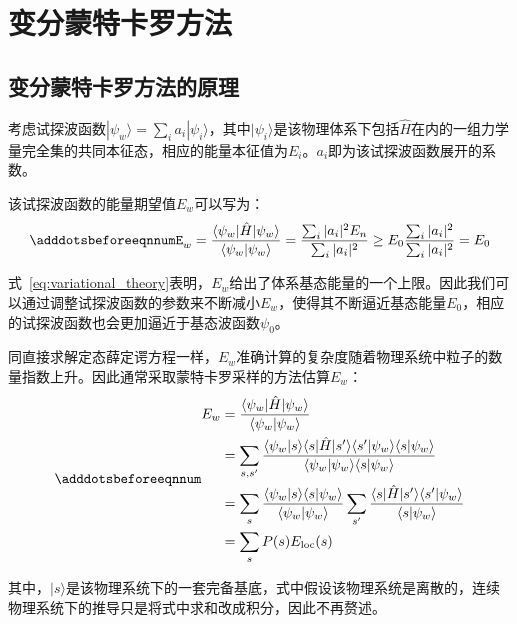 \chapter{变分蒙特卡罗方法}\label{chap:variational_Monte_Carlo}
\section{变分蒙特卡罗方法的原理}
考虑试探波函数$|\psi_w \rangle = \sum_i a_i |\psi_{i}\rangle$，其中$|\psi_{i}\rangle$是该物理体系下包括$\hat{H}$在内的一组力学量完全集的共同本征态，相应的能量本征值为$E_i$。$a_i$即为该试探波函数展开的系数。

该试探波函数的能量期望值$E_w$可以写为：
\begin{equation} \label{eq:variational_theory}
    \adddotsbeforeeqnnum%
    E_w = \frac{\langle\psi_{w}|\hat{H}| \psi_{w}\rangle}{\langle\psi_{w}|\psi_{w}\rangle} = \frac{\sum_{i}|a_i|^{2} E_n}{\sum_{i} |a_{i}|^2} \geq E_0\frac{\sum_{i}|a_i|^{2}}{\sum_{i} |a_{i}|^2} = E_0
\end{equation}

式~\eqref{eq:variational_theory}表明，$E_w$给出了体系基态能量的一个上限。因此我们可以通过调整试探波函数的参数来不断减小$E_w$，使得其不断逼近基态能量$E_0$，相应的试探波函数也会更加逼近于基态波函数$\psi_0$。

同直接求解定态薛定谔方程一样，$E_w$准确计算的复杂度随着物理系统中粒子的数量指数上升。因此通常采取蒙特卡罗采样的方法估算$E_w$：
\begin{equation} \label{eq:E_w_sample}
    \adddotsbeforeeqnnum%
    \begin{split}
        E_w &= \frac{\langle\psi_{w}|\hat{H}| \psi_{w}\rangle}{\langle\psi_w | \psi_w\rangle} \\
        &= \sum_{s,s^{\prime}} \frac{\langle\psi_{w}|s\rangle \langle s|\hat{H}|s^{\prime}\rangle \langle s^{\prime}|\psi_{w}\rangle \langle s|\psi_{w} \rangle}{\langle\psi_{w}|\psi_{w}\rangle \langle s|\psi_{w} \rangle} \\
        &= \sum_{s} \frac{\langle\psi_{w}|s\rangle \langle s|\psi_{w}\rangle}{\langle\psi_{w}|\psi_{w}\rangle} \sum_{s^{\prime}}\frac{\langle s|\hat{H}|s^{\prime}\rangle \langle s^{\prime}|\psi_{w}\rangle}{\langle s|\psi_{w}\rangle} \\
        &= \sum_{s} P(s)E_{\text{loc}}(s)
    \end{split}
\end{equation}

其中，$|s\rangle$是该物理系统下的一套完备基底，式中假设该物理系统是离散的，连续物理系统下的推导只是将式中求和改成积分，因此不再赘述。

